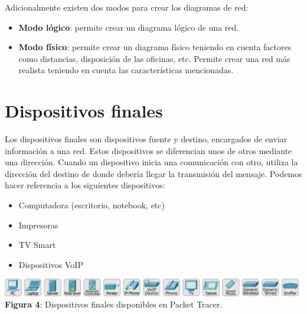 \documentclass{article}
\begin{document}
    Adicionalmente existen dos modos para crear los diagramas de red:
    \begin{itemize}
        \item {\bfseries Modo lógico}: permite crear un diagrama lógico de una red.
        \item {\bfseries Modo físico}: permite crear un diagrama físico teniendo en cuenta factores como distancias, disposición de las oficinas, etc. Permite crear una red más realista teniendo en cuenta las características mencionadas.
    \end{itemize}

    \section{Dispositivos finales}
    Los dispositivos finales son dispositivos fuente y destino, encargados de enviar información a una red. Estos dispositivos se diferencian unos de otros mediante una dirección. Cuando un dispositivo inicia una comunicación con otro, utiliza la dirección del destino de donde debería llegar la transmisión del mensaje. Podemos hacer referencia a los siguientes dispositivos:
    \begin{itemize}
        \item Computadora (escritorio, notebook, etc)
        \item Impresoras
        \item TV Smart
        \item Dispositivos VoIP
    \end{itemize}

    \begin{center}
        \includegraphics[width=0.65\linewidth]{img_2} 
        \linebreak
        \small {\bfseries Figura 4}: Dispositivos finales disponibles en Packet Tracer.
    \end{center}
\end{document}
